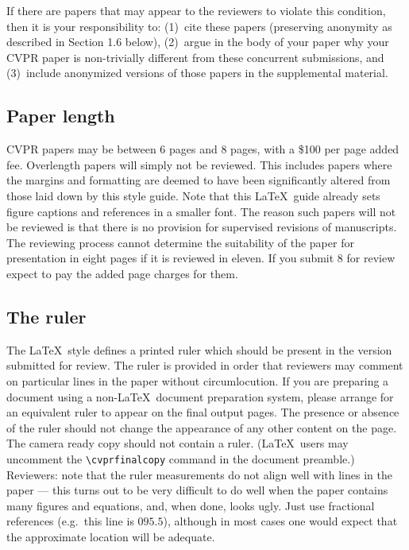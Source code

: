\documentclass[10pt,twocolumn,letterpaper]{article}
\begin{document}
If there are papers that may appear to the reviewers
to violate this condition, then it is your responsibility to: (1)~cite
these papers (preserving anonymity as described in Section 1.6 below),
(2)~argue in the body of your paper why your CVPR paper is non-trivially
different from these concurrent submissions, and (3)~include anonymized
versions of those papers in the supplemental material.

\subsection{Paper length}
CVPR papers may be between 6 pages and 8 pages, with a \$100 per page added
fee.  Overlength papers will simply not be reviewed.  This includes papers
where the margins and formatting are deemed to have been significantly
altered from those laid down by this style guide.  Note that this
\LaTeX\ guide already sets figure captions and references in a smaller font.
The reason such papers will not be reviewed is that there is no provision for
supervised revisions of manuscripts.  The reviewing process cannot determine
the suitability of the paper for presentation in eight pages if it is
reviewed in eleven.  If you submit 8 for review expect to pay the added page
charges for them. 

\subsection{The ruler}
The \LaTeX\ style defines a printed ruler which should be present in the
version submitted for review.  The ruler is provided in order that
reviewers may comment on particular lines in the paper without
circumlocution.  If you are preparing a document using a non-\LaTeX\
document preparation system, please arrange for an equivalent ruler to
appear on the final output pages.  The presence or absence of the ruler
should not change the appearance of any other content on the page.  The
camera ready copy should not contain a ruler. (\LaTeX\ users may uncomment
the \verb'\cvprfinalcopy' command in the document preamble.)  Reviewers:
note that the ruler measurements do not align well with lines in the paper
--- this turns out to be very difficult to do well when the paper contains
many figures and equations, and, when done, looks ugly.  Just use fractional
references (e.g.\ this line is $095.5$), although in most cases one would
expect that the approximate location will be adequate.
\end{document}
